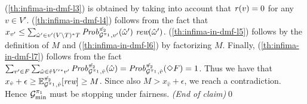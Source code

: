 \begin{myproof}
\begin{proofofclaim}
    (\ref{th:infima-in-dmf-l3}) is obtained by taking into account
    that $\mathit{r}(v) = 0$ for any $v \in V'$.
    (\ref{th:infima-in-dmf-l4}) follows from the fact that 
    $x_{v'} \leq \sum_{\hat{\omega}' \in v' (V \setminus T)^*T}  \MDPProb{\hat{\strat{2}}}_{\StochG^{\strat{1}},v'}(\hat{\omega}')\ \Rewards(\hat{\omega}')$.
    (\ref{th:infima-in-dmf-l5}) follows by the definition of $M$ and
    (\ref{th:infima-in-dmf-l6}) by factorizing $M$.
    Finally, (\ref{th:infima-in-dmf-l7}) follows from the fact 
    $\sum_{v' \in F} \sum_{\hat{\omega} \in \hat{v}{V'}^*v'} \mathit{Prob}^{\hat{\pi_{2}}}_{\mathcal{G}^{\pi_{1}},\hat{v}}(\hat{\omega}) =
    \mathit{Prob}^{\hat{\pi_{2}}}_{\mathcal{G}^{\pi_{1}},\hat{v}} (\Diamond F) = 1$.
    Thus we have that
    $x_{\hat{v}} + \epsilon \geq \mathbb{E}^{\hat{\pi_{2}}}_{\mathcal{G}^{\pi_{1}},\hat{v}}[\textit{rew}] \geq M$.
    Since also $M >  x_{\hat{v}} + \epsilon$, we reach  a contradiction.
    Hence $\mathcal{G}^{\pi_{1}}_{\min}$ must be stopping under fairness.
    \hfill\emph{(End of claim)}\qed
  \end{proofofclaim}



\end{myproof}
